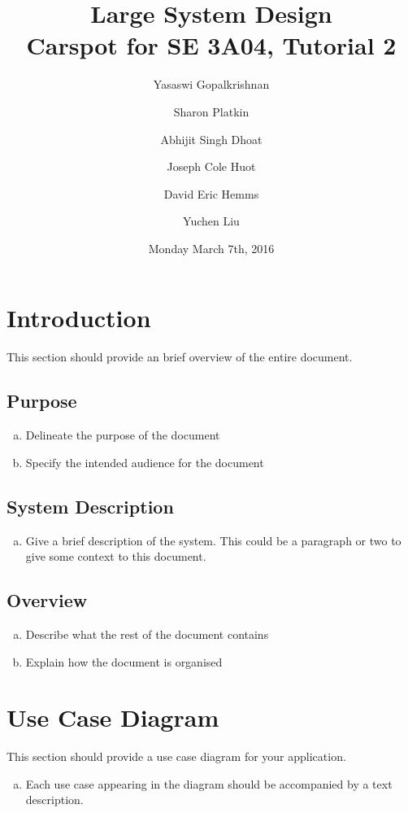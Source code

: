 \documentclass[12pt]{article}
\title{Large System Design\\
	\large Carspot for SE 3A04, Tutorial 2}
\author{
         Yasaswi Gopalkrishnan\\ \newline
         \and
         Sharon Platkin \\ \newline
         \and 
         Abhijit Singh Dhoat\\ \newline
         \and
         Joseph Cole Huot\\ \newline
         \and
         David Eric Hemms\\ \newline
         \and 
         Yuchen Liu\\ \newline
    }
\date{Monday March 7th, 2016}
\begin{document}
\maketitle
\newpage
\tableofcontents
\listoftables
\newpage	

\section{Introduction}
\label{sec:introduction}

This section should provide an brief overview of the entire document.

\subsection{Purpose}
\label{sub:purpose}
\begin{enumerate}[a)]
	\item Delineate the purpose of the document
	\item Specify the intended audience for the document
\end{enumerate}

\subsection{System Description}
\label{sub:system_description}
\begin{enumerate}[a)]
	\item Give a brief description of the system. This could be a paragraph or two to give some context to this document.
\end{enumerate}

\subsection{Overview}
\label{sub:overview}
\begin{enumerate}[a)]
	\item Describe what the rest of the document contains 
	\item Explain how the document is organised
\end{enumerate}


\section{Use Case Diagram}
\label{sec:use_case_diagram}
This section should provide a use case diagram for your application. 
\begin{enumerate}[a)]
	\item Each use case appearing in the diagram should be accompanied by a text description. 
\end{enumerate}
\end{document}
